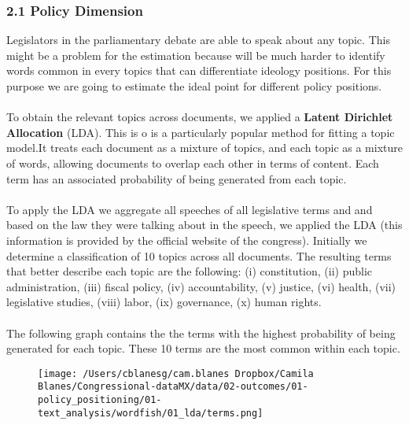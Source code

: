 \documentclass{article}
\begin{document}
 \subsubsection*{2.1 Policy Dimension}
Legislators in the parliamentary debate are able to speak about  any topic. This might be a problem for the estimation because will be much harder to identify words common in every topics that can differentiate ideology positions. For this purpose we are going to estimate the ideal point for different policy positions. \\
\\
To obtain the relevant topics across documents, we applied a \textbf{Latent Dirichlet Allocation} (LDA). This is o is a particularly popular method for fitting a topic model.It treats each document as a mixture of topics, and each topic as a mixture of words, allowing documents to overlap each other in terms of content. Each term has an associated probability of being generated from each topic. \\
\\ 
To apply the LDA we aggregate all speeches of all legislative terms and and based on the law they were talking about in the speech, we applied the LDA (this information is provided by the official website of the congress). Initially we determine a classification of 10 topics across all documents. The resulting terms that better describe each topic are the following: (i) constitution, (ii) public administration, (iii) fiscal policy, (iv)  accountability, (v) justice, (vi) health, (vii) legislative studies, (viii) labor, (ix) governance, (x) human rights. \\
\\
The following graph contains the the terms with the highest probability of being generated for each topic. These 10 terms are the most common within each topic. 

\begin{figure}[!h]
	\centering
	\begin{minipage}{1\textwidth}
		\centering
		\texttt{[image: /Users/cblanesg/cam.blanes Dropbox/Camila Blanes/Congressional-dataMX/data/02-outcomes/01-policy\_positioning/01-text\_analysis/wordfish/01\_lda/terms.png]}
		\label{fig:test1}
	\end{minipage}%
\end{figure}
\end{document}
